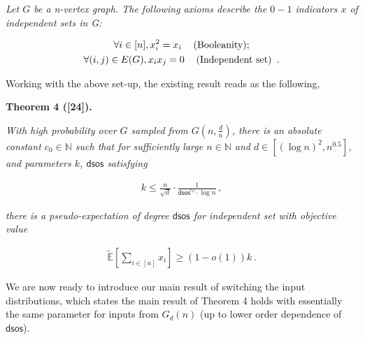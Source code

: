 \documentclass[10pt,a4paper]{article}
\begin{document}
\emph{Let $G$ be a n-vertex graph. The following axioms describe the $0-1$ indicators $x$ of independent sets in G:}\par


\[\begin{gathered}
\displaystyle\forall i\in[n],x_{i}^{2}=x_{i}\hskip 12.0pt\text{(Booleanity);} \\
\displaystyle\forall(i,j)\in E(G),x_{i}x_{j}=0\hskip 12.0pt\text{(Independent set) }\,.
\end{gathered}\]






Working with the above set-up, the existing result reads as the following,\par





\par\medskip\noindent\textbf{
\textbf{Theorem 4}\textbf{ }([24])\textbf{.}
}\par



\emph{With high probability over $G$ sampled from $G(n,\frac{d}{n})$, there is an absolute constant $c_{0}\in\mathbb{N}$ such that for sufficiently large $n\in\mathbb{N}$ and $d\in[(\log n)^{2},n^{0.5}]$,
and parameters $k$, $\mathsf{dsos}$ satisfying}\par


\[\begin{gathered}
k\leq\frac{n}{\sqrt{d}}\cdot\frac{1}{\mathsf{dsos}^{c_{0}}\cdot\log n}\,,
\end{gathered}\]


\emph{there is a pseudo-expectation of degree $\mathsf{dsos}$ for independent set with objective value}\par


\[\begin{gathered}
\widetilde{\mathbb{E}}[\sum_{i\in[n]}x_{i}]\geq(1-o(1))k\,.
\end{gathered}\]






We are now ready to introduce our main result of switching the input distributions, which states the main result of Theorem 4 holds with essentially the same parameter for inputs from $G_{d}(n)$ (up to lower order dependence of $\mathsf{dsos}$).\par
\end{document}
